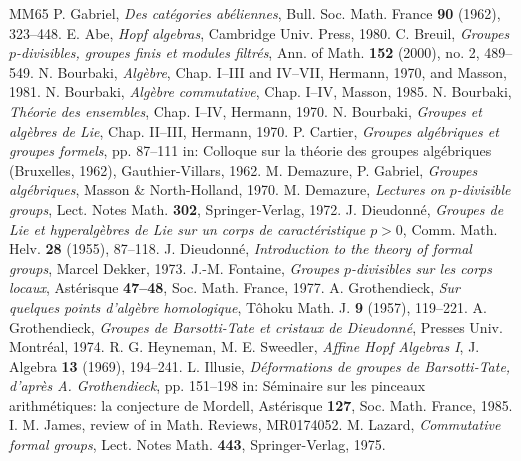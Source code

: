 \begin{thebibliography}{MM65}
 P. Gabriel, \textit{Des catégories abéliennes}, Bull. Soc. Math. France \textbf{90} (1962), 323--448.
 E. Abe, \textit{Hopf algebras}, Cambridge Univ. Press, 1980.
 C. Breuil, \textit{Groupes $p$-divisibles, groupes finis et modules filtrés}, Ann. of Math. \textbf{152} (2000), no. 2, 489--549.
 N. Bourbaki, \textit{Algèbre}, Chap. I--III and IV--VII, Hermann, 1970, and Masson, 1981.
 N. Bourbaki, \textit{Algèbre commutative}, Chap. I--IV, Masson, 1985.
 N. Bourbaki, \textit{Théorie des ensembles}, Chap. I--IV, Hermann, 1970.
 N. Bourbaki, \textit{Groupes et algèbres de Lie}, Chap. II--III, Hermann, 1970.
 P. Cartier, \textit{Groupes algébriques et groupes formels}, pp. 87--111 in: Colloque sur la théorie des groupes algébriques (Bruxelles, 1962), Gauthier-Villars, 1962.
 M. Demazure, P. Gabriel, \textit{Groupes algébriques}, Masson \& North-Holland, 1970.
 M. Demazure, \textit{Lectures on $p$-divisible groups}, Lect. Notes Math. \textbf{302}, Springer-Verlag, 1972.
 J. Dieudonné, \textit{Groupes de Lie et hyperalgèbres de Lie sur un corps de caractéristique $p>0$}, Comm. Math. Helv. \textbf{28} (1955), 87--118.
 J. Dieudonné, \textit{Introduction to the theory of formal groups}, Marcel Dekker, 1973.
 J.-M. Fontaine, \textit{Groupes $p$-divisibles sur les corps locaux}, Astérisque \textbf{47--48}, Soc. Math. France, 1977.
 A. Grothendieck, \textit{Sur quelques points d'algèbre homologique}, Tôhoku Math. J. \textbf{9} (1957), 119--221.
 A. Grothendieck, \textit{Groupes de Barsotti-Tate et cristaux de Dieudonné}, Presses Univ. Montréal, 1974.
 R. G. Heyneman, M. E. Sweedler, \textit{Affine Hopf Algebras I}, J. Algebra \textbf{13} (1969), 194--241.
 L. Illusie, \textit{Déformations de groupes de Barsotti-Tate, d'après A. Grothendieck}, pp. 151--198 in: Séminaire sur les pinceaux arithmétiques: la conjecture de Mordell, Astérisque \textbf{127}, Soc. Math. France, 1985.
 I. M. James, review of \cite{MM65} in Math. Reviews, MR0174052.
 M. Lazard, \textit{Commutative formal groups}, Lect. Notes Math. \textbf{443}, Springer-Verlag, 1975.

\end{thebibliography}
